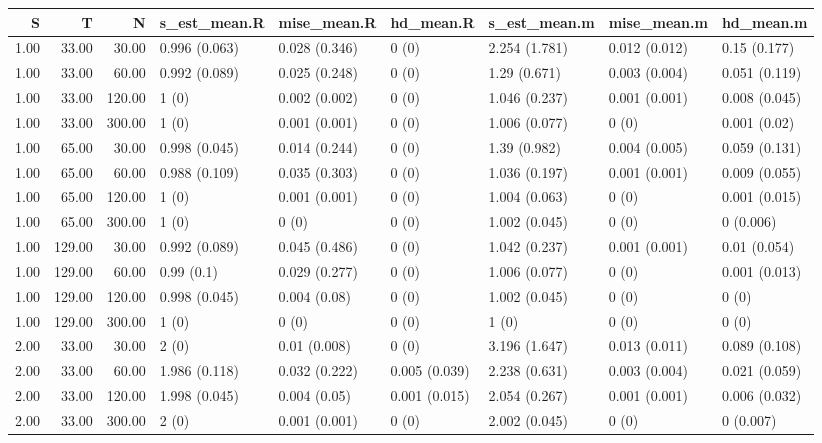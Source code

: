\begin{table}[ht]
\centering
\begin{tabular}{rrrllllll}
  \hline
S & T & N & s\_est\_mean.R & mise\_mean.R & hd\_mean.R & s\_est\_mean.m & mise\_mean.m & hd\_mean.m \\ 
  \hline
1.00 & 33.00 & 30.00 & 0.996 (0.063) & 0.028 (0.346) & 0 (0) & 2.254 (1.781) & 0.012 (0.012) & 0.15 (0.177) \\ 
  1.00 & 33.00 & 60.00 & 0.992 (0.089) & 0.025 (0.248) & 0 (0) & 1.29 (0.671) & 0.003 (0.004) & 0.051 (0.119) \\ 
  1.00 & 33.00 & 120.00 & 1 (0) & 0.002 (0.002) & 0 (0) & 1.046 (0.237) & 0.001 (0.001) & 0.008 (0.045) \\ 
  1.00 & 33.00 & 300.00 & 1 (0) & 0.001 (0.001) & 0 (0) & 1.006 (0.077) & 0 (0) & 0.001 (0.02) \\ 
  1.00 & 65.00 & 30.00 & 0.998 (0.045) & 0.014 (0.244) & 0 (0) & 1.39 (0.982) & 0.004 (0.005) & 0.059 (0.131) \\ 
  1.00 & 65.00 & 60.00 & 0.988 (0.109) & 0.035 (0.303) & 0 (0) & 1.036 (0.197) & 0.001 (0.001) & 0.009 (0.055) \\ 
  1.00 & 65.00 & 120.00 & 1 (0) & 0.001 (0.001) & 0 (0) & 1.004 (0.063) & 0 (0) & 0.001 (0.015) \\ 
  1.00 & 65.00 & 300.00 & 1 (0) & 0 (0) & 0 (0) & 1.002 (0.045) & 0 (0) & 0 (0.006) \\ 
  1.00 & 129.00 & 30.00 & 0.992 (0.089) & 0.045 (0.486) & 0 (0) & 1.042 (0.237) & 0.001 (0.001) & 0.01 (0.054) \\ 
  1.00 & 129.00 & 60.00 & 0.99 (0.1) & 0.029 (0.277) & 0 (0) & 1.006 (0.077) & 0 (0) & 0.001 (0.013) \\ 
  1.00 & 129.00 & 120.00 & 0.998 (0.045) & 0.004 (0.08) & 0 (0) & 1.002 (0.045) & 0 (0) & 0 (0) \\ 
  1.00 & 129.00 & 300.00 & 1 (0) & 0 (0) & 0 (0) & 1 (0) & 0 (0) & 0 (0) \\ 
  2.00 & 33.00 & 30.00 & 2 (0) & 0.01 (0.008) & 0 (0) & 3.196 (1.647) & 0.013 (0.011) & 0.089 (0.108) \\ 
  2.00 & 33.00 & 60.00 & 1.986 (0.118) & 0.032 (0.222) & 0.005 (0.039) & 2.238 (0.631) & 0.003 (0.004) & 0.021 (0.059) \\ 
  2.00 & 33.00 & 120.00 & 1.998 (0.045) & 0.004 (0.05) & 0.001 (0.015) & 2.054 (0.267) & 0.001 (0.001) & 0.006 (0.032) \\ 
  2.00 & 33.00 & 300.00 & 2 (0) & 0.001 (0.001) & 0 (0) & 2.002 (0.045) & 0 (0) & 0 (0.007) \\ 

\end{tabular}
\end{table}
